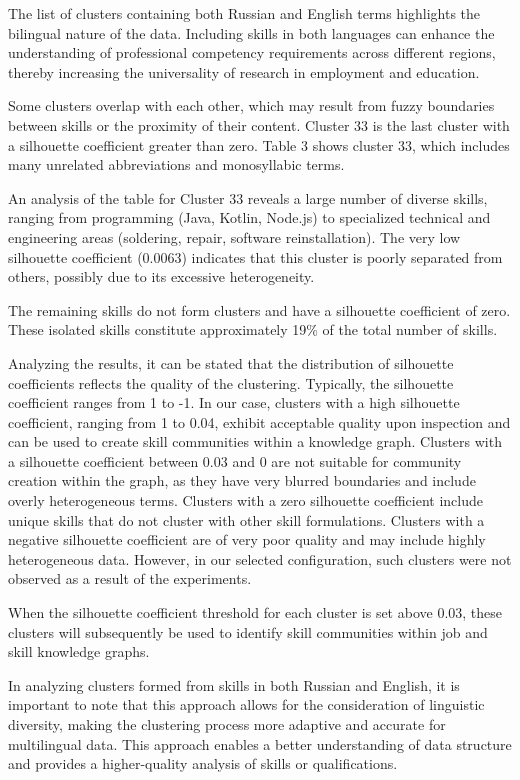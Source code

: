 \begin{multicols}{2}
The list of clusters containing both Russian and English terms
highlights the bilingual nature of the data. Including skills in both
languages can enhance the understanding of professional competency
requirements across different regions, thereby increasing the
universality of research in employment and education.

Some clusters overlap with each other, which may result from fuzzy
boundaries between skills or the proximity of their content. Cluster 33
is the last cluster with a silhouette coefficient greater than zero.
Table 3 shows cluster 33, which includes many unrelated abbreviations
and monosyllabic terms.

An analysis of the table for Cluster 33 reveals a large number of
diverse skills, ranging from programming (Java, Kotlin, Node.js) to
specialized technical and engineering areas (soldering, repair, software
reinstallation). The very low silhouette coefficient (0.0063) indicates
that this cluster is poorly separated from others, possibly due to its
excessive heterogeneity.

The remaining skills do not form clusters and have a silhouette
coefficient of zero. These isolated skills constitute approximately 19\%
of the total number of skills.

Analyzing the results, it can be stated that the distribution of
silhouette coefficients reflects the quality of the clustering.
Typically, the silhouette coefficient ranges from 1 to -1. In our case,
clusters with a high silhouette coefficient, ranging from 1 to 0.04,
exhibit acceptable quality upon inspection and can be used to create
skill communities within a knowledge graph. Clusters with a silhouette
coefficient between 0.03 and 0 are not suitable for community creation
within the graph, as they have very blurred boundaries and include
overly heterogeneous terms. Clusters with a zero silhouette coefficient
include unique skills that do not cluster with other skill formulations.
Clusters with a negative silhouette coefficient are of very poor quality
and may include highly heterogeneous data. However, in our selected
configuration, such clusters were not observed as a result of the
experiments.

When the silhouette coefficient threshold for each cluster is set above
0.03, these clusters will subsequently be used to identify skill
communities within job and skill knowledge graphs.

In analyzing clusters formed from skills in both Russian and English, it
is important to note that this approach allows for the consideration of
linguistic diversity, making the clustering process more adaptive and
accurate for multilingual data. This approach enables a better
understanding of data structure and provides a higher-quality analysis
of skills or qualifications.


\end{multicols}
